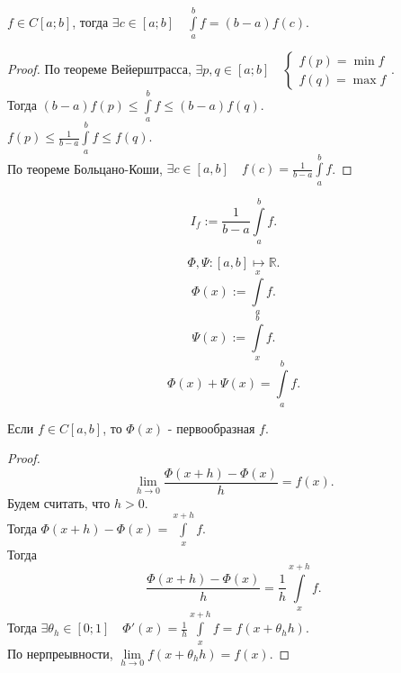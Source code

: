 \documentclass[11pt, oneside]{article}   	%
\begin{document}
       \begin{theorem}
           $f\in C\left[a; b\right]$, тогда $\exists{c\in \left[a; b\right]}\quad \int\limits_{a}^{b} f = (b-a)f(c) $.
           \begin{proof}
               По теореме Вейерштрасса, $\exists{p, q\in \left[a; b\right]}\quad \begin{cases}
                   f(p) = \min f\\
                   f(q) = \max f
               \end{cases}$.\\
               Тогда $(b-a)f(p) \le \int\limits_{a}^{b} f \le (b-a)f(q) $.\\
               $f(p) \le \frac{1}{b-a} \int\limits_{a}^{b} f \le f(q) $.\\
               По теореме Больцано-Коши, $\exists{c\in \left[a ,b\right]}\quad f(c) = \frac{1}{b-a}\int\limits_{a}^{b} f$.
           \end{proof}
       \end{theorem}
       \begin{definition}
       \[ I_f := \frac{1}{b-a} \int\limits_{a}^{b} f  .\]  
       \end{definition}
       \begin{definition}
           \[ \Phi, \Psi : \left[a, b\right] \mapsto \mathbb{R} .\] 
           \[ \Phi(x) := \int\limits_{a}^{x} f  .\]
           \[ \Psi(x) := \int\limits_{x}^{b} f  .\]
           \[ \Phi(x) + \Psi(x) = \int\limits_{a}^{b} f  .\] 
       \end{definition}
       \begin{theorem}
           Если $f\in C[a, b]$, то $\Phi(x)$ - первообразная $f$.
           \begin{proof}
               \[ \lim\limits_{h \to 0} \frac{\Phi(x+h) - \Phi(x)}{h} = f(x) .\]
               Будем считать, что $h>0$.\\
               Тогда $\Phi(x+h) - \Phi(x) = \int\limits_{x}^{x+h} f $.\\
               Тогда 
               \[ \frac{\Phi(x+h)-\Phi(x)}{h} = \frac{1}{h}\int\limits_{x}^{x+h} f  .\]
               Тогда $\exists{\theta_{h}\in \left[0; 1\right]}\quad \Phi'(x) = \frac{1}{h} \int\limits_{x}^{x+h} f  = f(x+\theta_h h) $.\\
               По нерпреывности, $\lim\limits_{h \to 0} f(x+\theta_{h} h) = f(x)$.
           \end{proof}
       \end{theorem}
\end{document}
